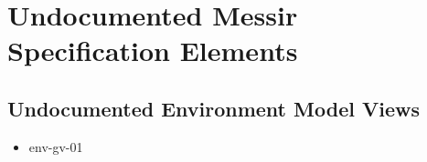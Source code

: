 	
\chapter{Undocumented Messir Specification Elements}









\section[Undocumented Environment Model Views]{Undocumented Environment Model Views}
\begin{itemize}
\item env-gv-01 
\end{itemize}






















